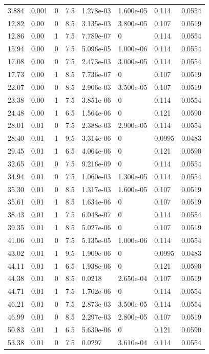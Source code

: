 \documentclass[preview]{standalone}
\begin{document}
{{\begin{tabular}{L{1.2cm}C{1.2cm} C{0.3cm}C{0.5cm} C{1.4cm}C{1.4cm} C{1.4cm}C{1.4cm}}
  3.884  &  0.001  & 0     & 7.5 &  1.278e-03  & 1.600e-05  & 0.114 &  0.0554   \\ 
  12.82  &  0.00  & 0     & 8.5 &  3.135e-03  & 3.800e-05  & 0.107 &  0.0519   \\ 
  12.86  &  0.00  & 1     & 7.5 &  7.789e-07  & 0  & 0.114 &  0.0554   \\ 
  15.94  &  0.00  & 0     & 7.5 &  5.096e-05  & 1.000e-06  & 0.114 &  0.0554   \\ 
  17.08  &  0.00  & 0     & 7.5 &  2.473e-03  & 3.000e-05  & 0.114 &  0.0554   \\ 
  17.73  &  0.00  & 1     & 8.5 &  7.736e-07  & 0  & 0.107 &  0.0519   \\ 
  22.07  &  0.00  & 0     & 8.5 &  2.906e-03  & 3.500e-05  & 0.107 &  0.0519   \\ 
  23.38  &  0.00  & 1     & 7.5 &  3.851e-06  & 0  & 0.114 &  0.0554   \\ 
  24.48  &  0.00  & 1     & 6.5 &  1.564e-06  & 0  & 0.121 &  0.0590   \\ 
  28.01  &  0.01  & 0     & 7.5 &  2.388e-03  & 2.900e-05  & 0.114 &  0.0554   \\ 
  28.40  &  0.01  & 1     & 9.5 &  3.314e-06  & 0  & 0.0995 &  0.0483   \\ 
  29.45  &  0.01  & 1     & 6.5 &  4.064e-06  & 0  & 0.121 &  0.0590   \\ 
  32.65  &  0.01  & 0     & 7.5 &  9.216e-09  & 0  & 0.114 &  0.0554   \\ 
  34.94  &  0.01  & 0     & 7.5 &  1.060e-03  & 1.300e-05  & 0.114 &  0.0554   \\ 
  35.30  &  0.01  & 0     & 8.5 &  1.317e-03  & 1.600e-05  & 0.107 &  0.0519   \\ 
  35.61  &  0.01  & 1     & 8.5 &  1.634e-06  & 0  & 0.107 &  0.0519   \\ 
  38.43  &  0.01  & 1     & 7.5 &  6.048e-07  & 0  & 0.114 &  0.0554   \\ 
  39.35  &  0.01  & 1     & 8.5 &  5.027e-06  & 0  & 0.107 &  0.0519   \\ 
  41.06  &  0.01  & 0     & 7.5 &  5.135e-05  & 1.000e-06  & 0.114 &  0.0554   \\ 
  43.02  &  0.01  & 1     & 9.5 &  1.909e-06  & 0  & 0.0995 &  0.0483   \\ 
  44.11  &  0.01  & 1     & 6.5 &  1.938e-06  & 0  & 0.121 &  0.0590   \\ 
  44.38  &  0.01  & 0     & 8.5 &  0.0218  & 2.650e-04  & 0.107 &  0.0519   \\ 
  44.71  &  0.01  & 1     & 7.5 &  1.702e-06  & 0  & 0.114 &  0.0554   \\ 
  46.21  &  0.01  & 0     & 7.5 &  2.873e-03  & 3.500e-05  & 0.114 &  0.0554   \\ 
  46.99  &  0.01  & 0     & 8.5 &  2.297e-03  & 2.800e-05  & 0.107 &  0.0519   \\ 
  50.83  &  0.01  & 1     & 6.5 &  5.630e-06  & 0  & 0.121 &  0.0590   \\ 
  53.38  &  0.01  & 0     & 7.5 &  0.0297  & 3.610e-04  & 0.114 &  0.0554   \\ 
\hline 
\end{tabular} 

}}
\end{document}
